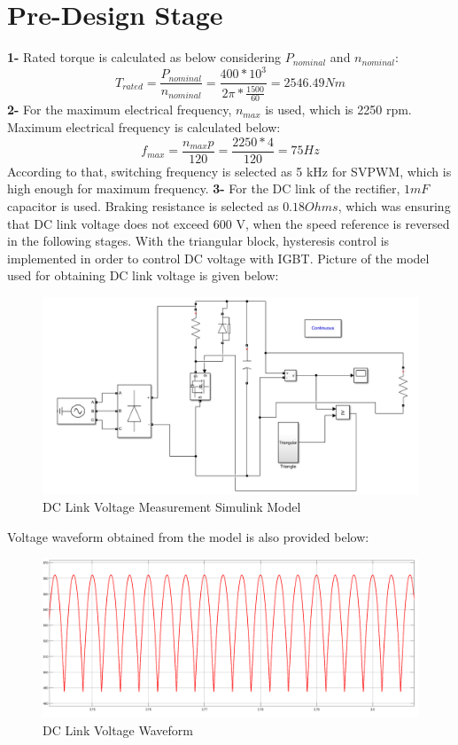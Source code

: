 \documentclass{article}
\begin{document}
\section{Pre-Design Stage}
\textbf{1-} Rated torque is calculated as below considering $P_{nominal}$ and $n_{nominal}$:
\begin{equation}
    T_{rated}=\frac{P_{nominal}}{n_{nominal}}=\frac{400*10^3}{2 \pi*\frac{1500}{60}}=2546.49 Nm
\end{equation}
\textbf{2-} For the maximum electrical frequency, $n_{max}$ is used, which is 2250 rpm. Maximum electrical frequency is calculated below:
\begin{equation}
    f_{max}=\frac{n_{max}p}{120}=\frac{2250*4}{120}=75 Hz
\end{equation}
According to that, switching frequency is selected as 5 kHz for SVPWM, which is high enough for maximum frequency.
\textbf{3-} For the DC link of the rectifier, $1 mF$ capacitor is used. Braking resistance is selected as $0.18 Ohms$, which was ensuring that DC link voltage does not exceed 600 V, when the speed reference is reversed in the following stages. With the triangular block, hysteresis control is implemented in order to control DC voltage with IGBT. Picture of the model used for obtaining DC link voltage is given below:
\begin{figure}[H]
    \centering
    \includegraphics[scale=0.4]{r_load.PNG}
    \caption{DC Link Voltage Measurement Simulink Model}
    \label{fig:my_label}
\end{figure}
Voltage waveform obtained from the model is also provided below:
\begin{figure}[H]
    \centering
    \includegraphics[scale=0.2]{dc_link.png}
    \caption{DC Link Voltage Waveform}
    \label{fig:my_label}
\end{figure}
\end{document}
